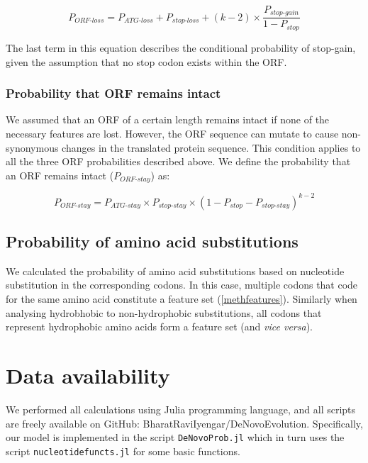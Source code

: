 \documentclass[12pt,a4paper]{article}
\begin{document}
\begin{equation}
P_\textit{ORF-loss} = P_\textit{ATG-loss} + P_\textit{stop-loss} + (k-2)\times \frac{P_\textit{stop-gain}}{1-P_\textit{stop}}
\label{eqorfloss}
\end{equation}

The last term in this equation describes the conditional probability of stop-gain, given the assumption that no stop codon exists within the ORF.

\subsubsection{Probability that ORF remains intact}

We assumed that an ORF of a certain length remains intact if none of the necessary features are lost. However, the ORF sequence can mutate to cause non-synonymous changes in the translated protein sequence. This condition applies to all the three ORF probabilities described above. We define the probability that an ORF remains intact ($P_\textit{ORF-stay}$) as:

\begin{equation}
P_\textit{ORF-stay} = P_\textit{ATG-stay} \times P_\textit{stop-stay} \times (1 - P_\textit{stop} - P_\textit{stop-stay})^{k-2}
\label{eqorfstay}
\end{equation}

\subsection{Probability of amino acid substitutions}

We calculated the probability of amino acid substitutions based on nucleotide substitution in the corresponding codons. In this case, multiple codons that code for the same amino acid constitute a feature set (\autoref{methfeatures}). Similarly when analysing hydrobhobic to non-hydrophobic substitutions, all codons that represent hydrophobic amino acids form a feature set (and \textit{vice versa}).

\section{Data availability}
We performed all calculations using Julia programming language, and all scripts are freely available on GitHub: BharatRaviIyengar/DeNovoEvolution. Specifically, our model is implemented in the script \texttt{DeNovoProb.jl} which in turn uses the script \texttt{nucleotidefuncts.jl} for some basic functions.



\small

\end{document}
